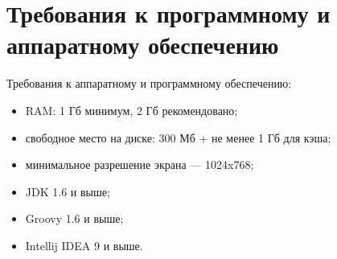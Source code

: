 \section{Требования к программному и аппаратному обеспечению} \label{sub23}

Требования к аппаратному и программному обеспечению: 

\begin{itemize}
\item{RAM: 1 Гб минимум, 2 Гб рекомендовано;}
\item{свободное место на диске: 300 Мб + не менее 1 Гб для кэша;}
\item{минимальное разрешение экрана — 1024x768;}
\item{JDK 1.6 и выше;}
\item{Groovy 1.6 и выше;}
\item{Intellij IDEA 9 и выше.}
\end{itemize}

